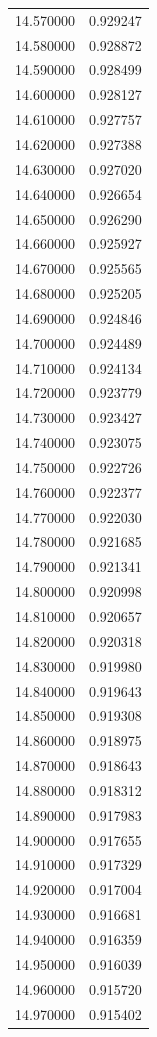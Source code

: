 \begin{tabular}{rr}
14.570000 & 0.929247 \\
14.580000 & 0.928872 \\
14.590000 & 0.928499 \\
14.600000 & 0.928127 \\
14.610000 & 0.927757 \\
14.620000 & 0.927388 \\
14.630000 & 0.927020 \\
14.640000 & 0.926654 \\
14.650000 & 0.926290 \\
14.660000 & 0.925927 \\
14.670000 & 0.925565 \\
14.680000 & 0.925205 \\
14.690000 & 0.924846 \\
14.700000 & 0.924489 \\
14.710000 & 0.924134 \\
14.720000 & 0.923779 \\
14.730000 & 0.923427 \\
14.740000 & 0.923075 \\
14.750000 & 0.922726 \\
14.760000 & 0.922377 \\
14.770000 & 0.922030 \\
14.780000 & 0.921685 \\
14.790000 & 0.921341 \\
14.800000 & 0.920998 \\
14.810000 & 0.920657 \\
14.820000 & 0.920318 \\
14.830000 & 0.919980 \\
14.840000 & 0.919643 \\
14.850000 & 0.919308 \\
14.860000 & 0.918975 \\
14.870000 & 0.918643 \\
14.880000 & 0.918312 \\
14.890000 & 0.917983 \\
14.900000 & 0.917655 \\
14.910000 & 0.917329 \\
14.920000 & 0.917004 \\
14.930000 & 0.916681 \\
14.940000 & 0.916359 \\
14.950000 & 0.916039 \\
14.960000 & 0.915720 \\
14.970000 & 0.915402 \\

\end{tabular}
